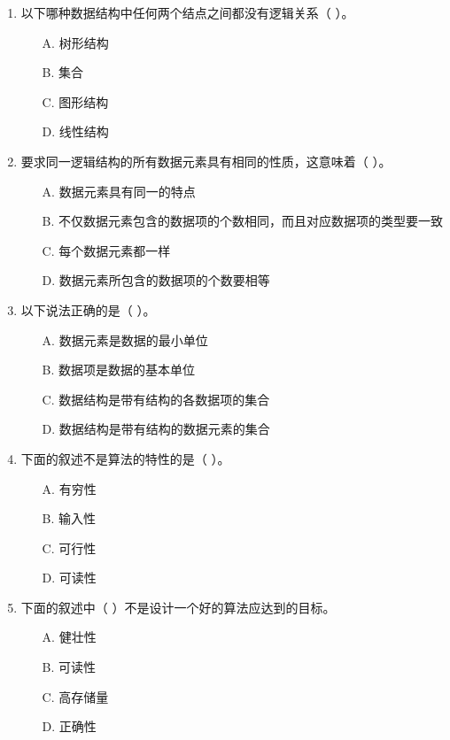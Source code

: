 \documentclass[12pt, a4paper]{article}
\begin{document}
\begin{enumerate}
    \item 以下哪种数据结构中任何两个结点之间都没有逻辑关系（ ）。
    \begin{enumerate}
        \item[A.] 树形结构
        \item[B.] 集合
        \item[C.] 图形结构
        \item[D.] 线性结构
    \end{enumerate}
    
    \item 要求同一逻辑结构的所有数据元素具有相同的性质，这意味着（ ）。
    \begin{enumerate}
        \item[A.] 数据元素具有同一的特点
        \item[B.] 不仅数据元素包含的数据项的个数相同，而且对应数据项的类型要一致
        \item[C.] 每个数据元素都一样
        \item[D.] 数据元素所包含的数据项的个数要相等
    \end{enumerate}
    
    \item 以下说法正确的是（ ）。
    \begin{enumerate}
        \item[A.] 数据元素是数据的最小单位
        \item[B.] 数据项是数据的基本单位
        \item[C.] 数据结构是带有结构的各数据项的集合
        \item[D.] 数据结构是带有结构的数据元素的集合
    \end{enumerate}
    
    \item 下面的叙述不是算法的特性的是（ ）。
    \begin{enumerate}
        \item[A.] 有穷性
        \item[B.] 输入性
        \item[C.] 可行性
        \item[D.] 可读性
    \end{enumerate}
    
    \item 下面的叙述中（ ）不是设计一个好的算法应达到的目标。
    \begin{enumerate}
        \item[A.] 健壮性
        \item[B.] 可读性
        \item[C.] 高存储量
        \item[D.] 正确性
    \end{enumerate}
    

\end{enumerate}
\end{document}
